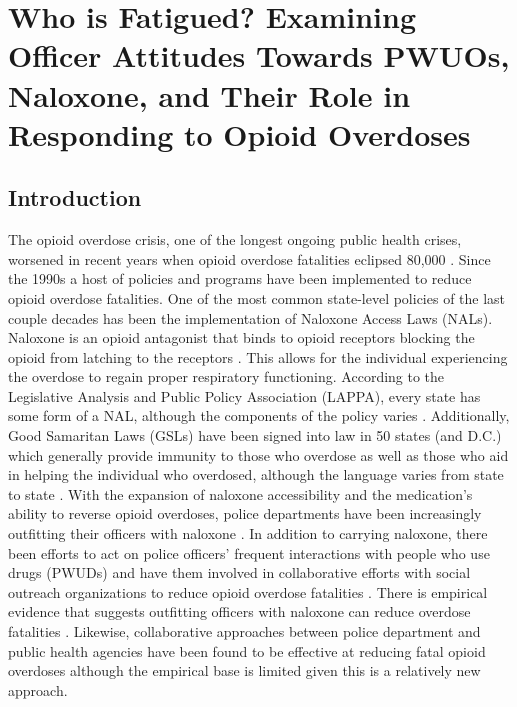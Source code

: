 \chapter{Who is Fatigued? Examining Officer Attitudes Towards PWUOs, Naloxone, and Their Role in Responding to Opioid Overdoses}

\section{Introduction}

The opioid overdose crisis, one of the longest ongoing public health crises, worsened in recent years when opioid overdose fatalities eclipsed 80,000 \parencite{center_for_disease_control_and_prevention_national_2023}. Since the 1990s a host of policies and programs have been implemented to reduce opioid overdose fatalities. One of the most common state-level policies of the last couple decades has been the implementation of Naloxone Access Laws (NALs). Naloxone is an opioid antagonist that binds to opioid receptors blocking the opioid from latching to the receptors \parencite{lurigio_opioid_2018}. This allows for the individual experiencing the overdose to regain proper respiratory functioning. According to the Legislative Analysis and Public Policy Association (LAPPA), every state has some form of a NAL, although the components of the policy varies \parencite{legislative_analysis_and_public_policy_association_naloxone_2022}. Additionally, Good Samaritan Laws (GSLs) have been signed into law in 50 states (and D.C.) which generally provide immunity to those who overdose as well as those who aid in helping the individual who overdosed, although the language varies from state to state \parencite{west_good_2023}. With the expansion of naloxone accessibility and the medication's ability to reverse opioid overdoses, police departments have been increasingly outfitting their officers with naloxone \parencite{lurigio_opioid_2018}. In addition to carrying naloxone, there been efforts to act on police officers' frequent interactions with people who use drugs (PWUDs) and have them involved in collaborative efforts with social outreach organizations to reduce opioid overdose fatalities \parencite{donnelly_law_2022, formica_characteristics_2021, yatsco_alternatives_2020}. There is empirical evidence that suggests outfitting officers with naloxone can reduce overdose fatalities \parencite{rando_intranasal_2015}. Likewise, collaborative approaches between police department and public health agencies have been found to be effective at reducing fatal opioid overdoses \parencite{donnelly_law_2022} although the empirical base is limited given this is a relatively new approach.

